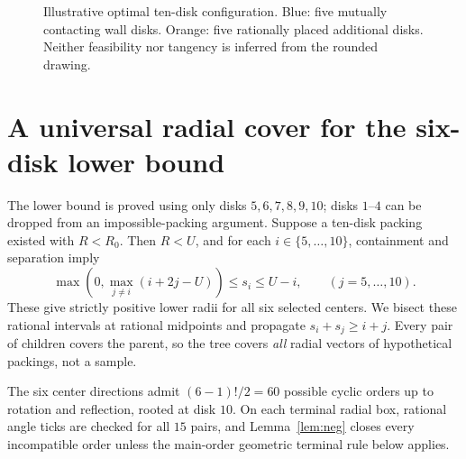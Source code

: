 \documentclass[11pt,a4paper]{article}
\newcommand{\Rcap}{U}
\begin{document}
\begin{figure}[htbp]\centering
{}
\caption{Illustrative optimal ten-disk configuration.  Blue: five mutually
contacting wall disks.  Orange: five rationally placed additional disks.
Neither feasibility nor tangency is inferred from the rounded drawing.}
\label{fig:witness}
\end{figure}

\section{A universal radial cover for the six-disk lower bound}
The lower bound is proved using only disks $5,6,7,8,9,10$; disks $1$--$4$
can be dropped from an impossible-packing argument.  Suppose a ten-disk
packing existed with $R<R_0$.  Then $R<\Rcap$, and for each
$i\in\{5,\ldots,10\}$, containment and separation imply
\begin{equation}\label{eq:init}
\max\left(0,\max_{j\ne i}(i+2j-\Rcap)\right)
 \le s_i\le\Rcap-i,\qquad (j=5,\ldots,10).
\end{equation}
These give strictly positive lower radii for all six selected centers.
We bisect these rational intervals at rational midpoints and propagate
$s_i+s_j\ge i+j$.  Every pair of children covers the parent, so the tree
covers \emph{all} radial vectors of hypothetical packings, not a sample.

The six center directions admit $(6-1)!/2=60$ possible cyclic orders up
to rotation and reflection, rooted at disk $10$.  On each terminal radial
box, rational angle ticks are checked for all $15$ pairs, and
Lemma~\ref{lem:neg} closes every incompatible order unless the main-order
geometric terminal rule below applies.
\end{document}
